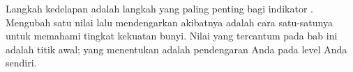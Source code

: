 \begin{catatabox}
Langkah kedelapan adalah langkah yang paling penting bagi indikator .
Mengubah satu nilai lalu mendengarkan akibatnya adalah cara satu-satunya untuk
memahami tingkat kekuatan bunyi. Nilai yang tercantum pada bab ini adalah
titik awal; yang menentukan adalah pendengaran Anda pada level Anda sendiri.
\end{catatabox}
